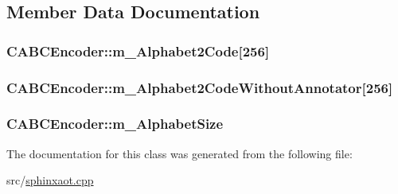 \subsection{Member Data Documentation}
\hypertarget{classCABCEncoder_ae1233e446eb7487c18ab3a4700fd3613}{
\subsubsection[{m\-\_\-\-Alphabet2\-Code}]{ C\-A\-B\-C\-Encoder\-::m\-\_\-\-Alphabet2\-Code\mbox{[}256\mbox{]}}}\label{classCABCEncoder_ae1233e446eb7487c18ab3a4700fd3613}
\hypertarget{classCABCEncoder_ac97273f3eea3bbf9f1390b271617119e}{
\subsubsection[{m\-\_\-\-Alphabet2\-Code\-Without\-Annotator}]{ C\-A\-B\-C\-Encoder\-::m\-\_\-\-Alphabet2\-Code\-Without\-Annotator\mbox{[}256\mbox{]}}}\label{classCABCEncoder_ac97273f3eea3bbf9f1390b271617119e}
\hypertarget{classCABCEncoder_a15d9a934285856375e6939e2707ed952}{
\subsubsection[{m\-\_\-\-Alphabet\-Size}]{ C\-A\-B\-C\-Encoder\-::m\-\_\-\-Alphabet\-Size}}\label{classCABCEncoder_a15d9a934285856375e6939e2707ed952}


The documentation for this class was generated from the following file\-:\begin{DoxyCompactItemize}
\item 
src/\hyperlink{sphinxaot_8cpp}{sphinxaot.\-cpp}\end{DoxyCompactItemize}
